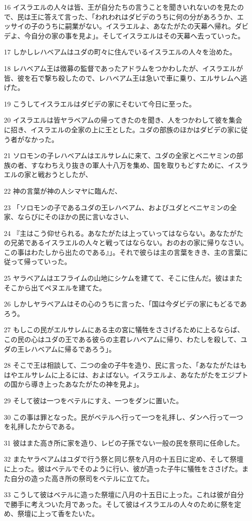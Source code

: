 \par 16 イスラエルの人々は皆、王が自分たちの言うことを聞きいれないのを見たので、民は王に答えて言った、「われわれはダビデのうちに何の分があろうか、エッサイの子のうちに嗣業がない。イスラエルよ、あなたがたの天幕へ帰れ。ダビデよ、今自分の家の事を見よ」。そしてイスラエルはその天幕へ去っていった。
\par 17 しかしレハベアムはユダの町々に住んでいるイスラエルの人々を治めた。
\par 18 レハベアム王は徴募の監督であったアドラムをつかわしたが、イスラエルが皆、彼を石で撃ち殺したので、レハベアム王は急いで車に乗り、エルサレムへ逃げた。
\par 19 こうしてイスラエルはダビデの家にそむいて今日に至った。
\par 20 イスラエルは皆ヤラベアムの帰ってきたのを聞き、人をつかわして彼を集会に招き、イスラエルの全家の上に王とした。ユダの部族のほかはダビデの家に従う者がなかった。
\par 21 ソロモンの子レハベアムはエルサレムに来て、ユダの全家とベニヤミンの部族の者、すなわちえり抜きの軍人十八万を集め、国を取りもどすために、イスラエルの家と戦おうとしたが、
\par 22 神の言葉が神の人シマヤに臨んだ、
\par 23 「ソロモンの子であるユダの王レハベアム、およびユダとベニヤミンの全家、ならびにそのほかの民に言いなさい、
\par 24 『主はこう仰せられる。あなたがたは上っていってはならない。あなたがたの兄弟であるイスラエルの人々と戦ってはならない。おのおの家に帰りなさい。この事はわたしから出たのである』」。それで彼らは主の言葉をきき、主の言葉に従って帰っていった。
\par 25 ヤラベアムはエフライムの山地にシケムを建てて、そこに住んだ。彼はまたそこから出てペヌエルを建てた。
\par 26 しかしヤラベアムはその心のうちに言った、「国は今ダビデの家にもどるであろう。
\par 27 もしこの民がエルサレムにある主の宮に犠牲をささげるために上るならば、この民の心はユダの王である彼らの主君レハベアムに帰り、わたしを殺して、ユダの王レハベアムに帰るであろう」。
\par 28 そこで王は相談して、二つの金の子牛を造り、民に言った、「あなたがたはもはやエルサレムに上るには、およばない。イスラエルよ、あなたがたをエジプトの国から導き上ったあなたがたの神を見よ」。
\par 29 そして彼は一つをベテルにすえ、一つをダンに置いた。
\par 30 この事は罪となった。民がベテルへ行って一つを礼拝し、ダンへ行って一つを礼拝したからである。
\par 31 彼はまた高き所に家を造り、レビの子孫でない一般の民を祭司に任命した。
\par 32 またヤラベアムはユダで行う祭と同じ祭を八月の十五日に定め、そして祭壇に上った。彼はベテルでそのように行い、彼が造った子牛に犠牲をささげた。また自分の造った高き所の祭司をベテルに立てた。
\par 33 こうして彼はベテルに造った祭壇に八月の十五日に上った。これは彼が自分で勝手に考えついた月であった。そして彼はイスラエルの人々のために祭を定め、祭壇に上って香をたいた。

